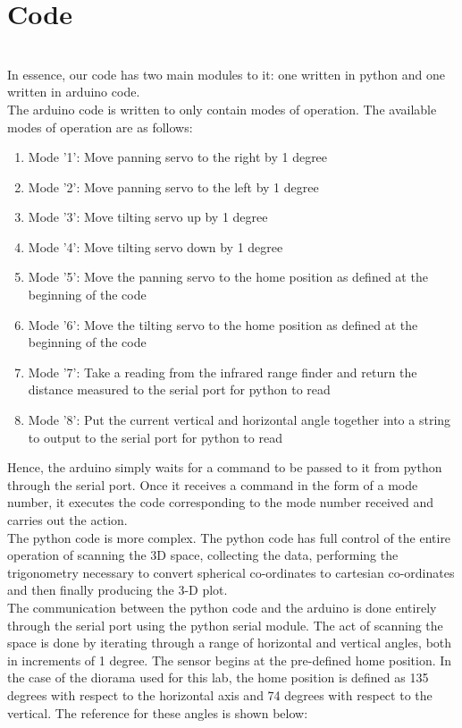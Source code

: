 \documentclass{article}
\begin{document}
\section{Code} \ \\
In essence, our code has two main modules to it: one written in python and one written in arduino code. \\

The arduino code is written to only contain modes of operation. The available modes of operation are as follows:

\begin{enumerate}

\item Mode '1': Move panning servo to the right by 1 degree
\item Mode '2': Move panning servo to the left by 1 degree
\item Mode '3': Move tilting servo up by 1 degree
\item Mode '4': Move tilting servo down by 1 degree
\item Mode '5': Move the panning servo to the home position as defined at the beginning of the code
\item Mode '6': Move the tilting servo to the home position as defined at the beginning of the code
\item Mode '7': Take a reading from the infrared range finder and return the distance measured to the serial port for python to read
\item Mode '8': Put the current vertical and horizontal angle together into a string to output to the serial port for python to read

\end{enumerate}


Hence, the arduino simply waits for a command to be passed to it from python through the serial port. Once it receives a command in the form of a mode number, it executes the code corresponding to the mode number received and carries out the action. \\

The python code is more complex. The python code has full control of the entire operation of scanning the 3D space, collecting the data, performing the trigonometry necessary to convert spherical co-ordinates to cartesian co-ordinates and then finally producing the 3-D plot. \\

The communication between the python code and the arduino is done entirely through the serial port using the python serial module. The act of scanning the space is done by iterating through a range of horizontal and vertical angles, both in increments of 1 degree. The sensor begins at the pre-defined home position. In the case of the diorama used for this lab, the home position is defined as 135 degrees with respect to the horizontal axis and 74 degrees with respect to the vertical. The reference for these angles is shown below: \\
\end{document}
